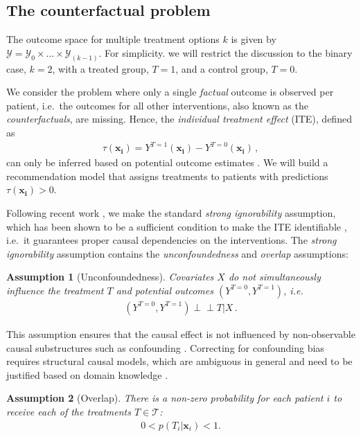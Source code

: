 \documentclass{article}
\newcommand{\indep}{\perp \!\!\! \perp}
\newcommand{\myvec}[1]{\boldsymbol{#1}}
\newtheorem{theorem}{Assumption}
\begin{document}
	
	
	
	
	\subsection{The counterfactual problem}
	The outcome space for multiple treatment options $k$ is given by $\mathcal{Y}=\mathcal{Y}_0\times\ldots\times\mathcal{Y}_{(k-1)}$. For simplicity. we will restrict the discussion to the binary case, $k=2$, with a treated group, $T=1$, and a control group, $T=0$.
	
	We consider the problem where only a single \textit{factual} outcome is observed per patient, i.e.~the outcomes for all other interventions, also known as the \textit{counterfactuals}, are missing. Hence, the \textit{individual treatment effect} (ITE), defined as 
	\begin{align*}
	\tau(\myvec{x_i})=Y^{T=1}(\myvec{x_i})-Y^{T=0}(\myvec{x_i})\,,
	\end{align*}
	can only be inferred based on potential outcome estimates \cite{Rubin.1974}. We will build a recommendation model that  assigns treatments to patients with predictions $\tau(\myvec{x_i})>0$.
	
	Following recent work \cite{Johansson.2016,Johansson.2020,Shalit.2016,Alaa.2017,Athey.2019,Wager.2017,Yoon.2018,Yao.2018}, we make the standard \textit{strong ignorability} assumption, which has been shown to be a sufficient condition to make the ITE identifiable \cite{Shalit.2016,Pearl.2017}, i.e.~it guarantees proper causal dependencies on the interventions. The \textit{strong ignorability} assumption contains the \textit{unconfoundedness} and \textit{overlap} assumptions:
	\begin{theorem}  [Unconfoundedness]
		Covariates $X$ do not simultaneously influence the treatment $T$ and potential outcomes $(Y^{T=0},Y^{T=1})$, i.e.
		\begin{align*}
		(Y^{T=0},Y^{T=1}) \indep T|X\,.
		\end{align*}
	\end{theorem}
	This assumption ensures that the causal effect is not influenced by non-observable causal substructures such as confounding \cite{Pearl.2009}. Correcting for confounding bias requires structural causal models, which are ambiguous in general and need to be justified based on domain knowledge \cite{Pearl.2008}.
	\begin{theorem}  [Overlap]
		There is a non-zero probability for each patient $i$ to receive each of the treatments $T\in\mathcal{T}$:
		\begin{align*}
		0<p(T_i|\myvec{x}_i)<1.
		\end{align*}
	\end{theorem}
	
\end{document}
